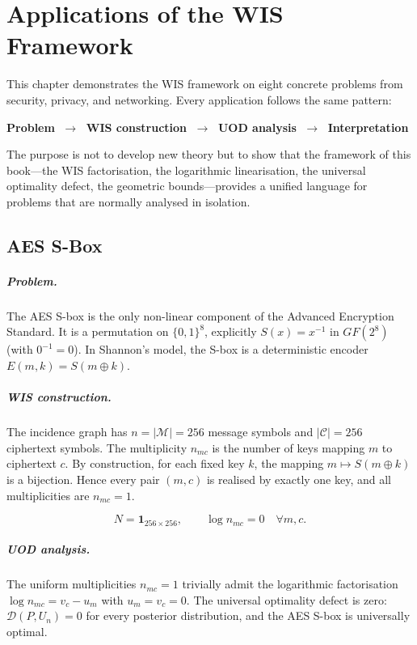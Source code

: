 \chapter[Applications]{Applications of the WIS Framework}\label{ch:sec:applications-of-the-wis-framework}

This chapter demonstrates the WIS framework on eight concrete
problems from security, privacy, and networking.  Every application
follows the same pattern:

\medskip
\noindent
\textbf{Problem} $\;\longrightarrow\;$ \textbf{WIS construction}
$\;\longrightarrow\;$ \textbf{UOD analysis} $\;\longrightarrow\;$
\textbf{Interpretation}
\medskip

The purpose is not to develop new theory but to show that the
framework of this book---the WIS factorisation, the logarithmic
linearisation, the universal optimality defect, the geometric
bounds---provides a unified language for problems that are normally
analysed in isolation.

\section{AES S-Box}\label{ch:sec:aes-sbox}
\label{sec:app-aes}

\paragraph{Problem.}
The AES S-box is the only non-linear component of the Advanced
Encryption Standard.  It is a permutation on $\{0,1\}^8$,
explicitly $S(x)=x^{-1}$ in $GF(2^8)$ (with $0^{-1}=0$).  In
Shannon's model, the S-box is a deterministic encoder
$E(m,k)=S(m\oplus k)$.

\paragraph{WIS construction.}
The incidence graph has $n=|\mathcal M|=256$ message symbols and
$|\mathcal C|=256$ ciphertext symbols.  The multiplicity
$n_{mc}$ is the number of keys mapping $m$ to ciphertext $c$.
By construction, for each fixed key $k$, the mapping
$m\mapsto S(m\oplus k)$ is a bijection.  Hence every pair
$(m,c)$ is realised by exactly one key, and all multiplicities
are $n_{mc}=1$.

\[
N = \mathbf{1}_{256\times256},\qquad
\log n_{mc}=0 \quad\forall m,c.
\]

\paragraph{UOD analysis.}
The uniform multiplicities $n_{mc}=1$ trivially admit the
logarithmic factorisation $\log n_{mc}=v_c-u_m$ with
$u_m=v_c=0$.  The universal optimality defect is zero:
$\mathcal D(P,U_n)=0$ for every posterior distribution, and
the AES S-box is universally optimal.


